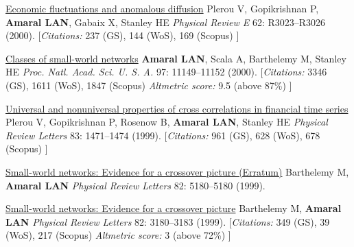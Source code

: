 \NumberedItem{\makebox[0.8cm][r]{[32]}}
\href{/people/amaral/economic-fluctuations-and-anomalous-diffusion}
{Economic fluctuations and anomalous diffusion}
\newline
Plerou V, Gopikrishnan P, {\textbf{Amaral LAN}}, Gabaix X, Stanley HE
\newline
\textit{Physical Review E}
    62:
R3023--R3026 (2000).
    \newline
    \hfill [{\em{Citations:}} 237 (GS),
    144 (WoS), 169 (Scopus)
    ]
\newline
\Gap
~
\Gap

\NumberedItem{\makebox[0.8cm][r]{[31]}}
\href{/people/amaral/classes-of-small-world-networks}
{Classes of small-world networks}
\newline
{\textbf{Amaral LAN}}, Scala A, Barthelemy M, Stanley HE
\newline
\textit{Proc. Natl. Acad. Sci. U. S. A.}
    97:
11149--11152 (2000).
    \newline
    \hfill [{\em{Citations:}} 3346 (GS),
    1611 (WoS), 1847 (Scopus)
        {\hspace*{1cm} \em{Altmetric score:}}  9.5 (above 87\%)
    ]
\newline
\Gap
~
\Gap

\NumberedItem{\makebox[0.8cm][r]{[30]}}
\href{/people/amaral/universal-and-nonuniversal-properties-of-cross-correlations-in-financial-time-series}
{Universal and nonuniversal properties of cross correlations in financial time series}
\newline
Plerou V, Gopikrishnan P, Rosenow B, {\textbf{Amaral LAN}}, Stanley HE
\newline
\textit{Physical Review Letters}
    83:
1471--1474 (1999).
    \newline
    \hfill [{\em{Citations:}} 961 (GS),
    628 (WoS), 678 (Scopus)
    ]
\newline
\Gap
~
\Gap

\NumberedItem{\makebox[0.8cm][r]{[29]}}
\href{/people/amaral/small-world-networks-evidence-for-a-crossover-picture-vol-82-pg-3180-1999}
{Small-world networks: Evidence for a crossover picture (Erratum)}
\newline
Barthelemy M, {\textbf{Amaral LAN}}
\newline
\textit{Physical Review Letters}
    82:
5180--5180 (1999).
\newline
\Gap
~
\Gap

\NumberedItem{\makebox[0.8cm][r]{[28]}}
\href{/people/amaral/small-world-networks-evidence-for-a-crossover-picture}
{Small-world networks: Evidence for a crossover picture}
\newline
Barthelemy M, {\textbf{Amaral LAN}}
\newline
\textit{Physical Review Letters}
    82:
3180--3183 (1999).
    \newline
    \hfill [{\em{Citations:}} 349 (GS),
    39 (WoS), 217 (Scopus)
        {\hspace*{1cm} \em{Altmetric score:}}  3 (above 72\%)
    ]
\newline
\Gap
~
\Gap

